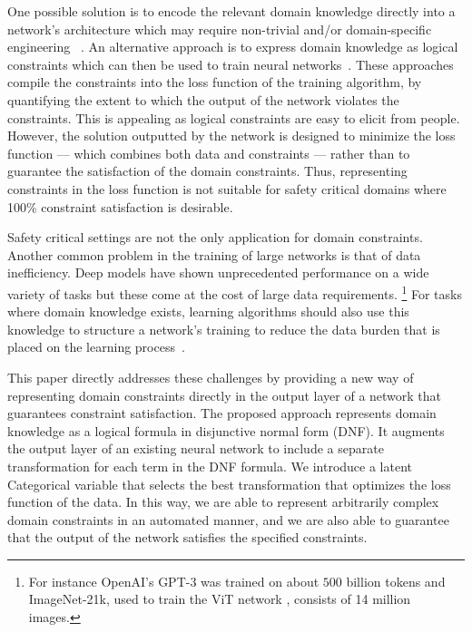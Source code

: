 \documentclass[letterpaper]{article} %
\begin{document}
One possible solution is to encode the relevant domain knowledge directly into a network's architecture which may require non-trivial and/or domain-specific engineering  ~\citep{goodfellow2016deep}. 
An alternative approach is to express domain knowledge as logical constraints which can then be used to train neural networks~\citep{xu2017semantic,fischer2018dl2,allen2020probabilistic}.  
These approaches compile the constraints into the loss function of the training algorithm, by quantifying the extent to which the output of the network violates the constraints.
This is appealing as logical constraints are easy to elicit from people. 
However, the solution outputted by the network is designed to minimize the loss function --- which combines both data and constraints --- rather than to guarantee the satisfaction of the domain constraints. 
Thus, representing constraints in the loss function is not suitable for safety critical domains where 100\% constraint satisfaction is desirable.

Safety critical settings are not the only application for domain constraints.
Another common problem in the training of large networks is that of data inefficiency.
Deep models have shown unprecedented performance on a wide variety of tasks but these come at the cost of large data requirements.%
    \footnote{For instance OpenAI's GPT-3 \citep{brown2020language} was trained on about $500$ billion tokens and ImageNet-21k, used to train the ViT network \citep{dosovitskiy2020image}, consists of 14 million images.}
For tasks where domain knowledge exists, learning algorithms should also use this knowledge to structure a network's training to reduce the data burden that is placed on the learning process~\citep{fischer2018dl2}.

This paper directly addresses these challenges by providing a new way of representing domain constraints directly in the output layer of a network that guarantees constraint satisfaction. 
The proposed approach represents domain knowledge as a logical formula in disjunctive normal form (DNF).  
It augments the output layer of an existing neural network to include a separate transformation for each term in the DNF formula.
We introduce a latent Categorical variable that selects the best transformation that optimizes the loss function of the data.
In this way, we are able to represent arbitrarily complex domain constraints in an automated manner, and we are also able to guarantee that the output of the network satisfies the specified constraints. 
\end{document}
